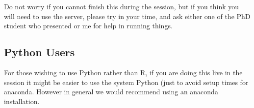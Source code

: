 \documentclass{article}
\begin{document}
Do not worry if you cannot finish this during the session, but if you think you
will need to use the server, please try in your time, and ask either one of the
PhD student who presented or me for help in running things. 

\subsection*{Python Users}

For those wishing to use Python rather than R, if you are doing this live in the session it might be easier to use the system Python (just to avoid setup times for anaconda. However in general we would recommend using an anaconda installation. 
\end{document}
